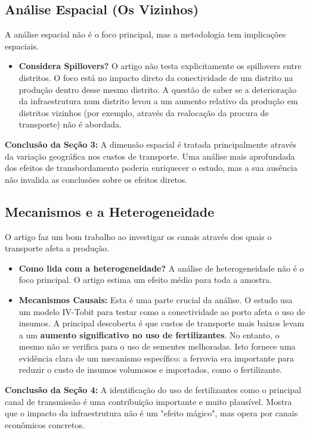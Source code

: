 \documentclass[12pt, a4paper]{article}
\begin{document}
\subsection{Análise Espacial (Os Vizinhos)}
A análise espacial não é o foco principal, mas a metodologia tem implicações espaciais.
\begin{itemize}
    \item \textbf{Considera Spillovers?} O artigo não testa explicitamente os spillovers entre distritos. O foco está no impacto direto da conectividade de um distrito na produção dentro desse mesmo distrito. A questão de saber se a deterioração da infraestrutura num distrito levou a um aumento relativo da produção em distritos vizinhos (por exemplo, através da realocação da procura de transporte) não é abordada.
\end{itemize}

\noindent\textbf{Conclusão da Seção 3:} A dimensão espacial é tratada principalmente através da variação geográfica nos custos de transporte. Uma análise mais aprofundada dos efeitos de transbordamento poderia enriquecer o estudo, mas a sua ausência não invalida as conclusões sobre os efeitos diretos.

\subsection{Mecanismos e a Heterogeneidade}
O artigo faz um bom trabalho ao investigar os canais através dos quais o transporte afeta a produção.
\begin{itemize}
    \item \textbf{Como lida com a heterogeneidade?} A análise de heterogeneidade não é o foco principal. O artigo estima um efeito médio para toda a amostra.
    \item \textbf{Mecanismos Causais:} Esta é uma parte crucial da análise. O estudo usa um modelo IV-Tobit para testar como a conectividade ao porto afeta o uso de insumos. A principal descoberta é que custos de transporte mais baixos levam a um \textbf{aumento significativo no uso de fertilizantes}. No entanto, o mesmo não se verifica para o uso de sementes melhoradas. Isto fornece uma evidência clara de um mecanismo específico: a ferrovia era importante para reduzir o custo de insumos volumosos e importados, como o fertilizante.
\end{itemize}

\noindent\textbf{Conclusão da Seção 4:} A identificação do uso de fertilizantes como o principal canal de transmissão é uma contribuição importante e muito plausível. Mostra que o impacto da infraestrutura não é um "efeito mágico", mas opera por canais econômicos concretos.
\end{document}
